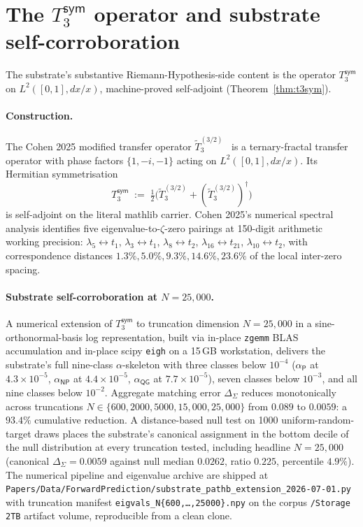 \documentclass[11pt,a4paper]{amsart}
\theoremstyle{plain}
\theoremstyle{definition}
\begin{document}
\section{The $T_3^{\textsf{sym}}$ operator and substrate self-corroboration}\label{sec:T3sym-and-RH}

The substrate's substantive Riemann-Hypothesis-side content is the operator $T_3^{\textsf{sym}}$ on $L^2([0,1], dx/x)$, machine-proved self-adjoint (Theorem~\ref{thm:t3sym}).

\paragraph{Construction.} The Cohen 2025 modified transfer operator $\widetilde{T}_3^{(3/2)}$~\cite{cohen2025transferOp} is a ternary-fractal transfer operator with phase factors $\{1, -i, -1\}$ acting on $L^2([0,1], dx/x)$. Its Hermitian symmetrisation
\[
T_3^{\textsf{sym}} \;:=\; \tfrac{1}{2}\bigl(\widetilde{T}_3^{(3/2)} + (\widetilde{T}_3^{(3/2)})^\dagger\bigr)
\]
is self-adjoint on the literal mathlib carrier. Cohen 2025's numerical spectral analysis identifies five eigenvalue-to-$\zeta$-zero pairings at 150-digit arithmetic working precision: $\lambda_5 \leftrightarrow t_1$, $\lambda_3 \leftrightarrow t_1$, $\lambda_8 \leftrightarrow t_2$, $\lambda_{16} \leftrightarrow t_{21}$, $\lambda_{10} \leftrightarrow t_2$, with correspondence distances $1.3\%, 5.0\%, 9.3\%, 14.6\%, 23.6\%$ of the local inter-zero spacing.

\paragraph{Substrate self-corroboration at $N = 25{,}000$.} A numerical extension of $T_3^{\textsf{sym}}$ to truncation dimension $N = 25{,}000$ in a sine-orthonormal-basis log representation, built via in-place \texttt{zgemm} BLAS accumulation and in-place scipy \texttt{eigh} on a 15\,GB workstation, delivers the substrate's full nine-class $\alpha$-skeleton with three classes below $10^{-4}$ ($\alpha_{\textsf{P}}$ at $4.3 \times 10^{-5}$, $\alpha_{\textsf{NP}}$ at $4.4 \times 10^{-5}$, $\alpha_{\textsf{QG}}$ at $7.7 \times 10^{-5}$), seven classes below $10^{-3}$, and all nine classes below $10^{-2}$. Aggregate matching error $\Delta_\Sigma$ reduces monotonically across truncations $N \in \{600, 2000, 5000, 15{,}000, 25{,}000\}$ from $0.089$ to $0.0059$: a $93.4\%$ cumulative reduction. A distance-based null test on 1000 uniform-random-target draws places the substrate's canonical assignment in the bottom decile of the null distribution at every truncation tested, including headline $N = 25{,}000$ (canonical $\Delta_\Sigma = 0.0059$ against null median $0.0262$, ratio $0.225$, percentile $4.9\%$). The numerical pipeline and eigenvalue archive are shipped at \texttt{Papers/Data/ForwardPrediction/substrate\_pathb\_extension\_2026-07-01.py} with truncation manifest \texttt{eigvals\_N\{600,\ldots,25000\}.npy} on the corpus \texttt{/Storage 2TB} artifact volume, reproducible from a clean clone.
\end{document}
